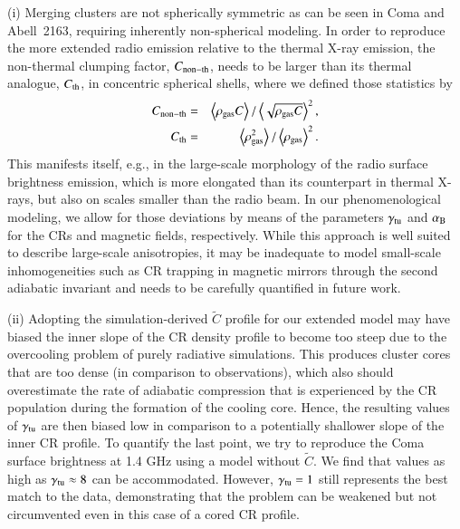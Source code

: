 \documentclass[useAMS,usenatbib]{mn2e}
\newcommand{\expval}[1]{\left\langle #1 \right\rangle}
\begin{document}
(i) Merging clusters are not spherically symmetric as can be seen in Coma and
Abell~2163, requiring inherently non-spherical modeling. In order to reproduce
the more extended radio emission relative to the thermal X-ray emission, the
non-thermal clumping factor, $C_{{\mathrm{non-th}}}$, needs to be larger than its
thermal analogue, $C_{{\mathrm{th}}}$, in concentric spherical shells, where we
defined those statistics by
\begin{eqnarray}
  \label{eq:clumping}
  C_{\rmn{non-th}} &=&
  \expval{\rho_\rmn{gas} C}/\expval{\sqrt{\rho_\rmn{gas} C}}^2,\\
  C_{\rmn{th}} &=& 
  \expval{\rho_\rmn{gas}^2}/\expval{\rho_\rmn{gas}}^2.
\end{eqnarray}
This manifests itself, e.g., in the large-scale morphology of the radio
surface brightness emission, which is more elongated than its counterpart in
thermal X-rays, but also on scales smaller than the radio beam. In our
phenomenological modeling, we allow for those deviations by means of the
parameters $\gamma_{{\mathrm{tu}}}$ and $ \alpha_{{\mathrm{B}}}$ for the CRs and
magnetic fields, respectively.  While this approach is well suited to describe
large-scale anisotropies, it may be inadequate to model small-scale
inhomogeneities such as CR trapping in magnetic mirrors through the second
adiabatic invariant and needs to be carefully quantified in future work.

(ii) Adopting the simulation-derived $\tilde{C}$ profile
\citep{2010MNRAS.409..449P} for our extended model may have biased the inner
slope of the CR density profile to become too steep due to the overcooling
problem of purely radiative simulations. This produces cluster cores that are
too dense (in comparison to observations), which also should overestimate the
rate of adiabatic compression that is experienced by the CR population during
the formation of the cooling core. Hence, the resulting values of
$\gamma_{{\mathrm{tu}}}$ are then biased low in comparison to a potentially shallower
slope of the inner CR profile. To quantify the last point, we try to reproduce
the Coma surface brightness at 1.4 GHz using a model without $\tilde{C}$. We
find that values as high as $\gamma_{{\mathrm{tu}}} \approx 8$ can be
accommodated. However, $\gamma_{{\mathrm{tu}}}=1$ still represents the best match to
the data, demonstrating that the problem can be weakened but not circumvented
even in this case of a cored CR profile.
\end{document}
